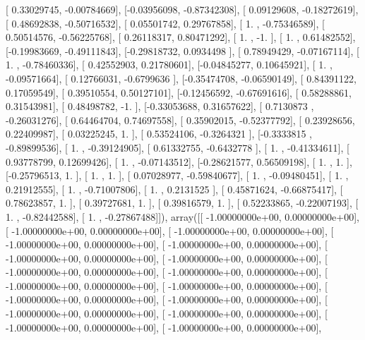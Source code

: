 \documentclass{article}
\begin{document}
       [ 0.33029745, -0.00784669],
       [-0.03956098, -0.87342308],
       [ 0.09129608, -0.18272619],
       [ 0.48692838, -0.50716532],
       [ 0.05501742,  0.29767858],
       [ 1.        , -0.75346589],
       [ 0.50514576, -0.56225768],
       [ 0.26118317,  0.80471292],
       [ 1.        , -1.        ],
       [ 1.        ,  0.61482552],
       [-0.19983669, -0.49111843],
       [-0.29818732,  0.0934498 ],
       [ 0.78949429, -0.07167114],
       [ 1.        , -0.78460336],
       [ 0.42552903,  0.21780601],
       [-0.04845277,  0.10645921],
       [ 1.        , -0.09571664],
       [ 0.12766031, -0.6799636 ],
       [-0.35474708, -0.06590149],
       [ 0.84391122,  0.17059549],
       [ 0.39510554,  0.50127101],
       [-0.12456592, -0.67691616],
       [ 0.58288861,  0.31543981],
       [ 0.48498782, -1.        ],
       [-0.33053688,  0.31657622],
       [ 0.7130873 , -0.26031276],
       [ 0.64464704,  0.74697558],
       [ 0.35902015, -0.52377792],
       [ 0.23928656,  0.22409987],
       [ 0.03225245,  1.        ],
       [ 0.53524106, -0.3264321 ],
       [-0.3333815 , -0.89899536],
       [ 1.        , -0.39124905],
       [ 0.61332755, -0.6432778 ],
       [ 1.        , -0.41334611],
       [ 0.93778799,  0.12699426],
       [ 1.        , -0.07143512],
       [-0.28621577,  0.56509198],
       [ 1.        ,  1.        ],
       [-0.25796513,  1.        ],
       [ 1.        ,  1.        ],
       [ 0.07028977, -0.59840677],
       [ 1.        , -0.09480451],
       [ 1.        ,  0.21912555],
       [ 1.        , -0.71007806],
       [ 1.        ,  0.2131525 ],
       [ 0.45871624, -0.66875417],
       [ 0.78623857,  1.        ],
       [ 0.39727681,  1.        ],
       [ 0.39816579,  1.        ],
       [ 0.52233865, -0.22007193],
       [ 1.        , -0.82442588],
       [ 1.        , -0.27867488]]), array([[ -1.00000000e+00,   0.00000000e+00],
       [ -1.00000000e+00,   0.00000000e+00],
       [ -1.00000000e+00,   0.00000000e+00],
       [ -1.00000000e+00,   0.00000000e+00],
       [ -1.00000000e+00,   0.00000000e+00],
       [ -1.00000000e+00,   0.00000000e+00],
       [ -1.00000000e+00,   0.00000000e+00],
       [ -1.00000000e+00,   0.00000000e+00],
       [ -1.00000000e+00,   0.00000000e+00],
       [ -1.00000000e+00,   0.00000000e+00],
       [ -1.00000000e+00,   0.00000000e+00],
       [ -1.00000000e+00,   0.00000000e+00],
       [ -1.00000000e+00,   0.00000000e+00],
       [ -1.00000000e+00,   0.00000000e+00],
       [ -1.00000000e+00,   0.00000000e+00],
       [ -1.00000000e+00,   0.00000000e+00],
       [ -1.00000000e+00,   0.00000000e+00],
\end{document}
